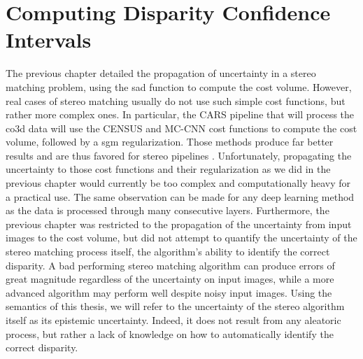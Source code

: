 \chapter{Computing Disparity Confidence Intervals}\label{chap:epistemic_uncertainty}
The previous chapter detailed the propagation of uncertainty in a stereo matching problem, using the \acrshort{sad} function to compute the cost volume. However, real cases of stereo matching usually do not use such simple cost functions, but rather more complex ones. In particular, the CARS pipeline that will process the \acrshort{co3d} data will use the CENSUS and MC-CNN cost functions  \cite{zabih_non-parametric_1994,zbontar_stereo_2016} to compute the cost volume, followed by a \acrshort{sgm} regularization. Those methods produce far better results and are thus favored for stereo pipelines \cite{hirschmuller_evaluation_2009}. Unfortunately, propagating the uncertainty to those cost functions and their regularization as we did in the previous chapter would currently be too complex and computationally heavy for a practical use. The same observation can be made for any deep learning method \cite{laga_survey_2022} as the data is processed through many consecutive layers. Furthermore, the previous chapter was restricted to the propagation of the uncertainty from input images to the cost volume, but did not attempt to quantify the uncertainty of the stereo matching process itself, \ie the algorithm's ability to identify the correct disparity. A bad performing stereo matching algorithm can produce errors of great magnitude regardless of the uncertainty on input images, while a more advanced algorithm may perform well despite noisy input images. Using the semantics of this thesis, we will refer to the uncertainty of the stereo algorithm itself as its epistemic uncertainty. Indeed, it does not result from any aleatoric process, but rather a lack of knowledge on how to automatically identify the correct disparity.


